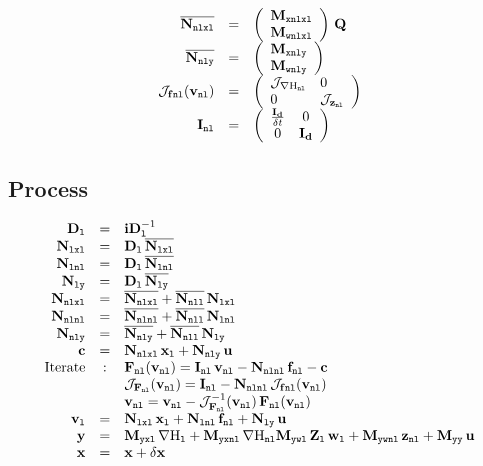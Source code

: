 \documentclass[10pt,a4paper]{article}
\begin{document}
\begin{equation}
\begin{array}{rcl}
\\
\overline{\N{nlxl}}
&=&
\left(\begin{array}{ll}
\M{xnlxl}\\ 
 \M{wnlxl}
\end{array}\right)
\,
\Q
\\
\overline{\N{nly}}
&=&
\left(\begin{array}{ll}
\M{xnly}\\ 
 \M{wnly}
\end{array}\right)
\\
\mathcal{J}_{\vec f \lab {nl}}(\vec v_{\lab {nl}})
&=&
\left(\begin{array}{ll}
\mathcal{J}_{\nabla \Hnl}	& 0\\ 
0& \mathcal{J}_{\vznl}
\end{array}\right)
\\
\mat I_{\lab{nl}}
&=&
\left(
\begin{array}{cc}
\frac{\Id}{\delta t} & 0 \\
0 & \Id
\end{array}
\right)
\end{array}
\end{equation}
%
\subsection{Process}
\begin{equation}
\begin{array}{rcl}
\mat D_{\lab l}&=& \mat{iD}_{\lab l}^{-1}\\
\N{lxl} &=& \mat D_{\lab l}\,\overline{\N{lxl}}\\
\N{lnl} &=& \mat D_{\lab l}\,\overline{\N{lnl}}\\
\N{ly} &=& \mat D_{\lab l}\,\overline{\N{ly}}\\
\N{nlxl} &=& \overline{\N{nlxl}} + \overline{\N{nll}}\,{\N{lxl}}\\
\N{nlnl} &=& \overline{\N{nlnl}} + \overline{\N{nll}}\,{\N{lnl}}\\
\N{nly} &=& \overline{\N{nly}} + \overline{\N{nll}}\,{\N{ly}}\\
\vec c &=& \N{nlxl}\,\vxl + \N{nly}\,\vu \\
\mbox{Iterate}  &:&\vec F_{\lab{nl}}(\vec v_{\lab{nl}})=\mat I_{\lab{nl}}\, \vec v_{\lab{nl}}-\N{nlnl}\,\vec f_{\lab{nl}} - \vec c \\
&&\mathcal{J}_{\vec F_{\lab{nl}}}(\vec v_{\lab{nl}}) 
=
\mat I_{\lab{nl}} - \N{nlnl}\,\mathcal{J}_{\vec f \lab {nl}}(\vec v_{\lab {nl}})\\
& & \vec v_{\lab{nl}} = \vec v_{\lab{nl}}-\mathcal{J}^{-1}_{\vec F_{\lab{nl}}}(\vec v_{\lab{nl}}) \,\vec F_{\lab{nl}}(\vec v_{\lab{nl}})\\
\vec v_{\lab{l}} &=& \N{lxl}\,\vxl +\N{lnl}\,\vec f_{\lab{nl}} + \N{ly}\,\vu\\
\vy & = &\M{yxl}\,\nabla \Hl + \M{yxnl}\,\nabla \Hnl\M{ywl}\,\mat Z_{\lab l}\,\vwl + \M{ywnl}\,\vznl + \M{yy}\,\vu\\
\vx & = &\vx+ \delta \vx
\end{array}
\end{equation}
\end{document}
